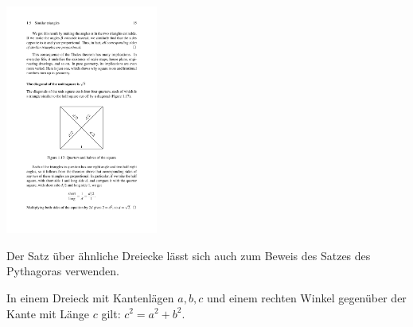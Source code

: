 \begin{center}
    \includegraphics[width=5cm]{BILDER/BildDiagonaleImQuadrat.pdf}
\end{center}

Der Satz über ähnliche Dreiecke lässt sich auch zum Beweis des Satzes des Pythagoras verwenden.


\begin{thm}
    In einem Dreieck mit Kantenlägen $a,b,c$ und einem rechten Winkel gegenüber der Kante mit Länge
    $c$ gilt: $c^2=a^2+b^2$.
\end{thm}

